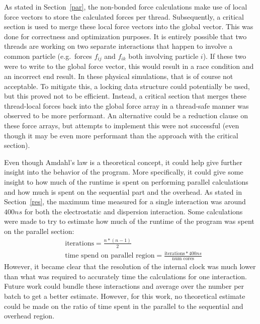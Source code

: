 \documentclass[conference]{IEEEtran}
\begin{document}
As stated in Section~\ref{par}, the non-bonded force calculations make use of local force vectors to store the
calculated forces per thread. Subsequently, a critical section is used to merge these local force vectors
into the global vector. This was done for correctness and optimization purposes. It is entirely possible that two threads
are working on two separate interactions that happen to involve a common particle (e.g.\ forces $f_{ij}$ and $f_{ik}$ both 
involving particle $i$). If these two were to write to the global force vector, this would result in a race condition
and an incorrect end result. In these physical simulations, that is of course not acceptable. To mitigate this, a
locking data structure could potentially be used, but this proved not to be efficient. Instead, a critical section
that merges these thread-local forces back into the global force array in a thread-safe manner 
was observed to be more performant. An alternative could be a reduction clause on these force arrays, but attempts to
implement this were not successful (even though it may be even more performant than the approach with the critical
section).

Even though Amdahl's law is a theoretical concept, it could help give further insight into the behavior of the
program. More specifically, it could give some insight to how much of the runtime is spent on performing
parallel calculations and how much is spent on the sequential part and the overhead.
As stated in Section~\ref{res}, the maximum time measured for a single interaction was around $400 ns$ for both
the electrostatic and dispersion interaction. Some calculations were made to try to estimate how much of the runtime
of the program was spent on the parallel section:
\begin{align*}
    &\text{iterations} = \frac{n*(n-1)}{2}\\
    &\text{time spend on parallel region} = \frac{\text{iterations}*400ns}{\text{num cores}}
\end{align*} 
However, it became clear that the resolution of the internal clock was much lower than what was required to accurately
time the calculations for one interaction. Future work could bundle these interactions and average over the number
per batch to get a better estimate. However, for this work, no theoretical estimate could be made on the ratio of
time spent in the parallel to the sequential and overhead region.
\end{document}
